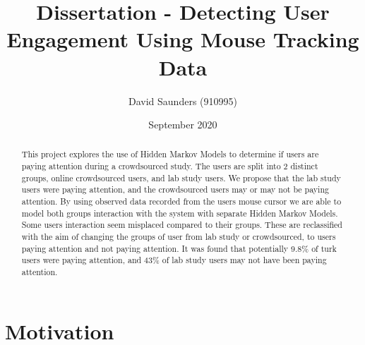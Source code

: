 \documentclass{article}
\title{Dissertation - Detecting User Engagement Using Mouse Tracking Data}
\author{David Saunders (910995)}
\date{September 2020}
\begin{document}
\maketitle



\begin{abstract} 
    This project explores the use of Hidden Markov Models to determine if users are paying attention during a crowdsourced study.
    The users are split into 2 distinct groups, online crowdsourced users, and lab study users.
    We propose that the lab study users were paying attention, and the crowdsourced users may or may not be paying attention.
    By using observed data recorded from the users mouse cursor we are able to model both groups interaction with the system with separate Hidden Markov Models.
    Some users interaction seem misplaced compared to their groups.
    These are reclassified with the aim of changing the groups of user from lab study or crowdsourced, to users paying attention and not paying attention.     
    It was found that potentially 9.8\% of turk users were paying attention, and 43\% of lab study users may not have been paying attention.
\end{abstract}

\tableofcontents



\section{Motivation}


\end{document}
